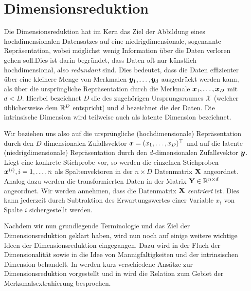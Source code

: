 \chapter{Dimensionsreduktion}
\label{ch:Dimensionsreduktion}

Die Dimensionsreduktion hat im Kern das Ziel der Abbildung eines hochdimensionalen Datensatzes auf
eine niedrigdimensionale, sogenannte  Repräsentation, wobei möglichst wenig
Information über die Daten verloren gehen soll.\addref Dies ist darin begründet, dass Daten oft nur
künstlich hochdimensional, also \textit{redundant} sind. Dies bedeutet, dass die Daten effizienter
über eine kleinere Menge von Merkmalen $\bm{y}_1,\ldots,\bm{y}_d$ ausgedrückt werden kann,
als über die ursprüngliche Repräsentation durch die Merkmale $\bm{x}_1,\ldots,\bm{x}_D$ mit
$d < D$. Hierbei bezeichnet $D$ die  des zugehörigen
Ursprungsraumes $\mathcal{X}$ (welcher üblicherweise dem $\mathbb{R}^D$ entspricht) und $d$ bezeichnet
die  der Daten. Die intrinsische Dimension wird teilweise auch als
latente Dimension bezeichnet.

Wir beziehen uns also auf die ursprüngliche (hochdimensionale) Repräsentation durch den
$D$-dimensionalen Zufallsvektor $\bm{x} = (x_1, \ldots, x_D)^\top$ und auf die latente
(niedrigdimensionale) Repräsentation durch den $d$-dimensionalen Zufallsvektor $\bm{y}$. Liegt
eine konkrete Stichprobe vor, so werden die einzelnen Stichproben $\bm{x}^{(i)}, i = 1,\ldots,n$
als Spaltenvektoren in der $n \times D$ Datenmatrix $\mathbf{X}$ angeordnet. Analog dazu werden die
transformierten Daten in der Matrix $\mathbf{Y} \in \mathbb{R}^{n \times d}$ angeordnet. Wir werden
annehmen, dass die Datenmatrix $\mathbf{X}$ \textit{zentriert} ist. Dies kann jederzeit durch
Subtraktion des Erwartungswertes einer Variable $x_i$ von Spalte $i$ sichergestellt werden.

Nachdem wir nun grundlegende Terminologie und das Ziel der Dimensionsreduktion geklärt haben, wird
nun noch auf einige weitere wichtige Ideen der Dimensionsreduktion eingegangen. Dazu wird in
 der Fluch der Dimensionalität sowie in
 die Idee von Mannigfaltigkeiten und
der intrinsischen Dimension behandelt. In  werden kurz
verschiedene Ansätze zur Dimensionsreduktion vorgestellt und in
 wird die Relation zum Gebiet der
Merksmalsextrahierung besprochen.
